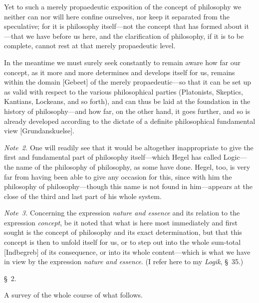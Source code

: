 \documentclass[12pt,a4paper]{book}
\begin{document}
{\small Yet to such a merely propaedeutic exposition of the concept of philosophy
we neither can nor will here confine ourselves, nor keep it separated from the
speculative; for it is philosophy itself---not the concept that has formed about
it---that we have before us here, and the clarification of philosophy, if it is
to be complete, cannot rest at that merely propaedeutic level.\par}

{\small In the meantime we must surely seek constantly to remain aware how far
our concept, as it more and more determines and develops itself for us, remains
within the domain [Gebeet] of the merely propaedeutic---so that it can be set up
as valid with respect to the various philosophical parties (Platonists,
Skeptics, Kantians, Lockeans, and so forth), and can thus be laid at the
foundation in the history of philosophy---and how far, on the other hand, it goes
further, and so is already developed according to the dictate of a definite
philosophical fundamental view [Grundanskuelse].\par}

{\small\emph{Note~2.} One will readily see that it would be altogether
inappropriate to give the first and fundamental part of philosophy itself---which
Hegel has called Logic---the name of the philosophy of philosophy, as some have
done. Hegel, too, is very far from having been able to give any occasion for
this, since with him the philosophy of philosophy---though this name is not found
in him---appears at the close of the third and last part of his whole
system.\par}

{\small\emph{Note~3.} Concerning the expression \emph{nature and essence} and its
relation to the expression \emph{concept}, be it noted that what is here most
immediately and first sought is the concept of philosophy and its exact
determination, but that this concept is then to unfold itself for us, or to step
out into the whole sum-total [Indbegreb] of its consequence, or into its whole
content---which is what we have in view by the expression \emph{nature and
essence}. (I refer here to my \textit{Logik}, \S~35.)\par}

\begin{center}\large\S~2.\end{center}
\begin{center}A survey of the whole course of what follows.\end{center}
\end{document}
